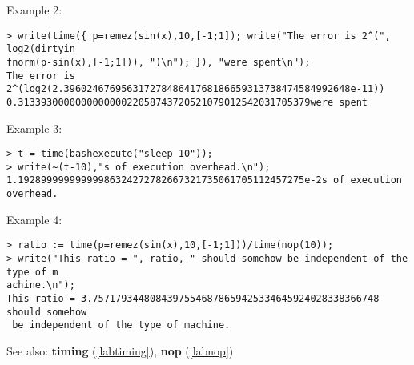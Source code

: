 \noindent Example 2: 
\begin{center}\begin{minipage}{15cm}\begin{Verbatim}[frame=single]
> write(time({ p=remez(sin(x),10,[-1;1]); write("The error is 2^(", log2(dirtyin
fnorm(p-sin(x),[-1;1])), ")\n"); }), "were spent\n");
The error is 2^(log2(2.39602467695631727848641768186659313738474584992648e-11))
0.313393000000000000022058743720521079012542031705379were spent
\end{Verbatim}
\end{minipage}\end{center}
\noindent Example 3: 
\begin{center}\begin{minipage}{15cm}\begin{Verbatim}[frame=single]
> t = time(bashexecute("sleep 10"));
> write(~(t-10),"s of execution overhead.\n");
1.19289999999999986324272782667321735061705112457275e-2s of execution overhead.
\end{Verbatim}
\end{minipage}\end{center}
\noindent Example 4: 
\begin{center}\begin{minipage}{15cm}\begin{Verbatim}[frame=single]
> ratio := time(p=remez(sin(x),10,[-1;1]))/time(nop(10));
> write("This ratio = ", ratio, " should somehow be independent of the type of m
achine.\n");
This ratio = 3.75717934480843975546878659425334645924028338366748 should somehow
 be independent of the type of machine.
\end{Verbatim}
\end{minipage}\end{center}
See also: \textbf{timing} (\ref{labtiming}), \textbf{nop} (\ref{labnop})
